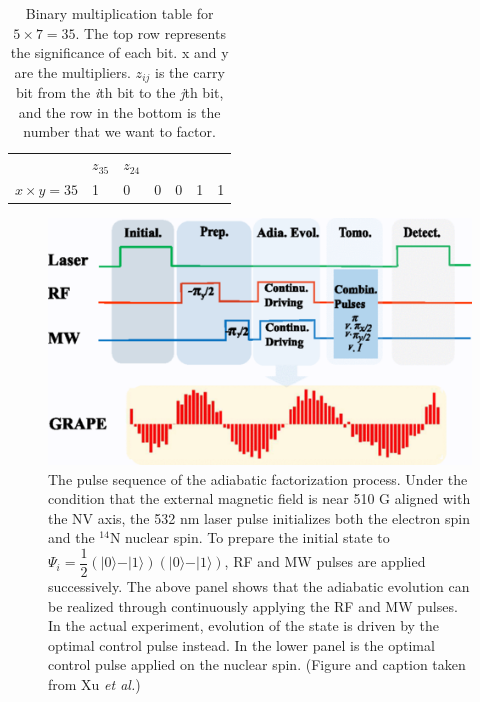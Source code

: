 \documentclass[%
 reprint,
 amsmath,amssymb,
 aps,
]{revtex4-1}
\begin{document}
\begin{table}[h]
\begin{flushleft}
\begin{tabular}{ p{1.7cm}  p{1cm} p{1cm} p{1cm} p{1cm} p{1cm} p{1cm}}
\hspace{0.1cm} &$z_{35}$ &$z_{24}$ &\hspace{0.1cm}  &\hspace{0.1cm} &\hspace{0.1cm} &\hspace{0.1cm} \\ 

$x \times y = 35$ &1 &0 &0 &0 &1 &1 \\ 
\hline
\end{tabular}
\end{flushleft}
\caption{Binary multiplication table for $ 5 \times 7 = 35 $. The top row represents the significance of each bit. x and y are the multipliers. $z_{ij}$ is the carry bit from the \textit{i}th bit to the \textit{j}th bit, and the row in the bottom is the number that we want to factor\cite{Xu2017}.
}
\label{tab:binmult}
\end{table}

	
	\begin{figure}[h]
	\includegraphics[scale=0.49]{Fig2XuEtAl}
	\caption{	
		The pulse sequence of the adiabatic factorization process. Under the condition that the external magnetic field is near 510 G aligned with the NV axis, the 532 nm laser pulse initializes both the electron spin and the $^{14}$N nuclear spin. To prepare the initial state to $\Psi_i = \dfrac{1}{2}\left(\vert 0 \rangle - \vert 1 \rangle   \right)\left(\vert 0 \rangle - \vert 1 \rangle   \right)$, RF and MW pulses are applied successively. The above panel shows that the adiabatic evolution can be realized through continuously applying the RF and MW pulses. In the actual experiment, evolution of the state is driven by the optimal control pulse instead. In the lower panel is the optimal control pulse applied on the nuclear spin. (Figure and caption taken from Xu \textit{et al.}\cite{Xu2017})
	}
	\label{fig:pulse}
	\end{figure}
\end{document}
